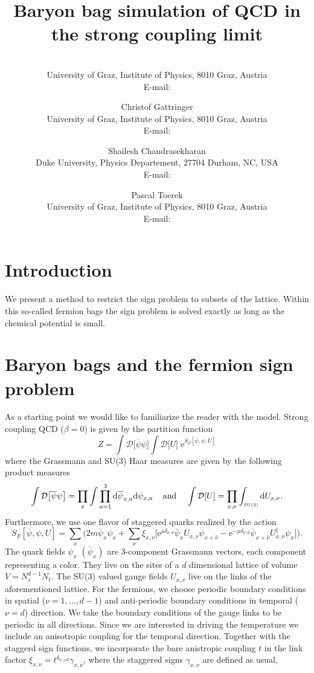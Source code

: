 \documentclass{PoS}
\title{Baryon bag simulation of QCD in the strong coupling limit}
\author{\speaker{Oliver Orasch}\\
        University of Graz, Institute of Physics, 8010 Graz, Austria\\
        E-mail: \email{oliver.orasch@uni-graz.at}}
\author{Christof Gattringer\\
        University of Graz, Institute of Physics, 8010 Graz, Austria\\
        E-mail: \email{christof.gattringer@uni-graz.at}}
\author{Shailesh Chandrasekharan\\
        Duke University, Physics Departement, 27704 Durham, NC, USA\\
        E-mail: \email{sch@phy.duke.edu}}
\author{Pascal Toerek\\
        University of Graz, Institute of Physics, 8010 Graz, Austria\\
        E-mail: \email{pascal.toerek@uni-graz.at}}
\begin{document}
\section{Introduction}

We present a method to restrict the sign problem to subsets of the lattice. Within this so-called fermion bags the sign problem is solved exactly as long as the chemical potential is small.

\section{Baryon bags and the fermion sign problem}


As a starting point we would like to familiarize the reader with the model. Strong coupling QCD ($\beta = 0$) is given by the partition function
\begin{equation}
Z = \int \mathcal{D}\big[\overline{\psi}\psi\big] \int \mathcal{D}\big[U\big] \;\text{e}^{S_F\left[\overline{\psi},\psi,U\right]}
\label{eq:part_sum}
\end{equation} 
where the Grassmann and SU(3) Haar measures are given by the following product measures
\begin{equation*}
\int \mathcal{D}\big[\overline{\psi}\psi\big]  = \prod_{x} \int \prod_{a = 1}^{3}\text{d}\overline{\psi}_{x,a}\text{d}\psi_{x,a} \;\;\;\text{ and } \;\;\;\int \mathcal{D}[U] = \prod_{x,\nu} \int_{\text{\tiny SU(3)}} \text{d}U_{x,\nu}.
\end{equation*}
Furthermore, we use one flavor of staggered quarks realized by the action
\begin{equation}
S_F\left[\overline{\psi},\psi,U\right] = \sum_x\Big(2m\overline{\psi}_x \psi_x + \sum_{\nu} \xi_{x,\nu}\Big[ \text{e}^{\mu\delta_{\nu, d}}\overline{\psi}_{x} U_{x,\nu} \psi_{x+\hat{\nu}} - \text{e}^{-\mu\delta_{\nu, d}}\overline{\psi}_{x+\hat{\nu}}U^{\dagger}_{x, \nu} \psi_{x} \Big] \Big).
\label{eq:stag_act}
\end{equation}
The quark fields $\psi_x$ $(\overline{\psi}_x)$ are 3-component Grassmann vectors, each component representing a color. They live on the sites of a $d$ dimensional lattice of volume $V = N_s^{d-1}N_t$. The SU(3) valued gauge fields $U_{x,\nu}$ live on the links of the aforementioned lattice. For the fermions, we choose periodic boundary conditions in spatial ($\nu = 1,\dots, d-1$) and anti-periodic boundary conditions in temporal ($\nu = d$) direction. We take the boundary conditions of the gauge links to be periodic in all directions. Since we are interested in driving the temperature we include an anisotropic coupling for the temporal direction. Together with the staggerd sign functions, we incorporate the bare anistropic coupling $t$ in the link factor $\xi_{x,\nu} = t^{\delta_{\nu,\pm d}}\gamma_{x,\nu}$, where the staggered signs $\gamma_{x,\nu}$ are defined as usual,
\end{document}
